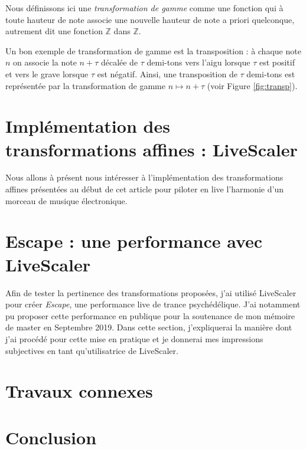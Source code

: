 \documentclass{article}
\begin{document}
Nous définissons ici une \emph{transformation de gamme} comme une fonction qui à toute hauteur de note associe une nouvelle hauteur de note a priori quelconque, autrement dit une fonction $\mathbb{Z}$ dans $\mathbb{Z}$.

Un bon exemple de transformation de gamme est la transposition : à chaque note $n$ on associe la note $n+\tau$  décalée de $\tau$ demi-tons vers l'aigu lorsque $\tau$ est positif et vers le grave lorsque $\tau$ est négatif. Ainsi, une transposition de $\tau$ demi-tons est représentée par la transformation de gamme $ n \mapsto n+\tau$ (voir Figure \ref{fig:transp}).










\section{Implémentation des transformations affines : LiveScaler}
Nous allons à présent nous intéresser à l'implémentation des transformations affines présentées au début de cet article pour piloter en live l'harmonie d'un morceau de musique électronique. 









\section{Escape : une performance avec LiveScaler }
Afin de tester la pertinence des transformations proposées, j'ai utilisé LiveScaler pour créer \emph{Escape}, une performance live de trance psychédélique. J'ai notamment pu proposer cette performance en publique pour la soutenance de mon mémoire de master en Septembre 2019. Dans cette section, j'expliquerai la manière dont j'ai procédé pour cette mise en pratique et je donnerai mes impressions subjectives en tant qu'utilisatrice de LiveScaler.





\section{Travaux connexes}



\section{Conclusion}

\end{document}
